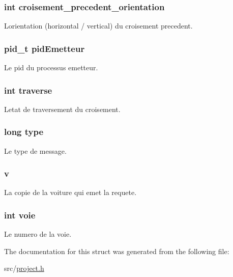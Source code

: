 \subsubsection[{croisement\+\_\+precedent\+\_\+orientation}]{\setlength{\rightskip}{0pt plus 5cm}int croisement\+\_\+precedent\+\_\+orientation}\label{struct_requete_a9ee9e497cd0d78d4214a6507a550239c}
L\textquotesingle{}orientation (horizontal / vertical) du croisement precedent. \hypertarget{struct_requete_a3041e2766c91f9b17975056266bfc841}{}
\subsubsection[{pid\+Emetteur}]{\setlength{\rightskip}{0pt plus 5cm}pid\+\_\+t pid\+Emetteur}\label{struct_requete_a3041e2766c91f9b17975056266bfc841}
Le pid du processus emetteur. \hypertarget{struct_requete_a276684defbdd9a2e8b95ce40b8ef3576}{}
\subsubsection[{traverse}]{\setlength{\rightskip}{0pt plus 5cm}int traverse}\label{struct_requete_a276684defbdd9a2e8b95ce40b8ef3576}
L\textquotesingle{}etat de traversement du croisement. \hypertarget{struct_requete_a6a83a8677f7c78fd146859325e08209a}{}
\subsubsection[{type}]{\setlength{\rightskip}{0pt plus 5cm}long type}\label{struct_requete_a6a83a8677f7c78fd146859325e08209a}
Le type de message. \hypertarget{struct_requete_a76a64000aab59dcc4195c1b6e1605eb3}{}
\subsubsection[{v}]{ v}\label{struct_requete_a76a64000aab59dcc4195c1b6e1605eb3}
La copie de la voiture qui emet la requete. \hypertarget{struct_requete_ad5ecb866a563750cd63db63b9b56c060}{}
\subsubsection[{voie}]{\setlength{\rightskip}{0pt plus 5cm}int voie}\label{struct_requete_ad5ecb866a563750cd63db63b9b56c060}
Le numero de la voie. 

The documentation for this struct was generated from the following file\+:\begin{DoxyCompactItemize}
\item 
src/\hyperlink{project_8h}{project.\+h}\end{DoxyCompactItemize}

